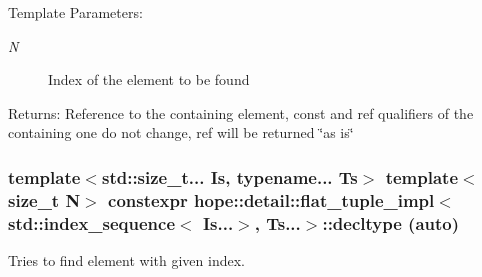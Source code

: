 \begin{Desc}
\item[Template Parameters:]
\begin{description}
\item[{\em N}]Index of the element to be found \end{description}
\end{Desc}
\begin{Desc}
\item[Returns:]Reference to the containing element, const and ref qualifiers of the containing one do not change, ref will be returned \char`\"{}as is\char`\"{} \end{Desc}
\hypertarget{classhope_1_1detail_1_1flat__tuple__impl_3_01std_1_1index__sequence_3_01_is_8_8_8_4_00_01_ts_8_8_8_4_6f82e0562ca06b099334fa7c08e0eb64}{
\subsubsection[{decltype}]{\setlength{\rightskip}{0pt plus 5cm}template$<$std::size\_\-t... Is, typename... Ts$>$ template$<$size\_\-t N$>$ constexpr hope::detail::flat\_\-tuple\_\-impl$<$ std::index\_\-sequence$<$ Is...$>$, Ts...$>$::decltype (auto)}}
\label{classhope_1_1detail_1_1flat__tuple__impl_3_01std_1_1index__sequence_3_01_is_8_8_8_4_00_01_ts_8_8_8_4_6f82e0562ca06b099334fa7c08e0eb64}


Tries to find element with given index. 


